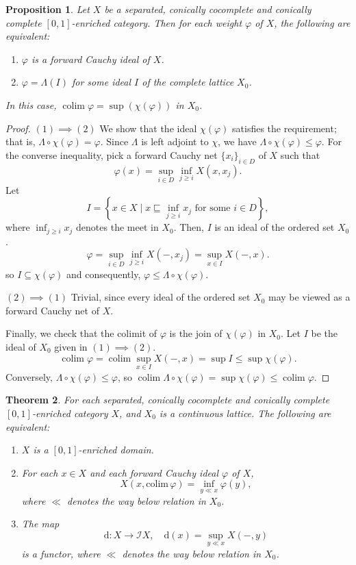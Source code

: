 \documentclass[preprint,3p,times]{elsarticle}
\theoremstyle{plain}
\newtheorem{thm}{Theorem}[section]
\newtheorem{prop}[thm]{Proposition}
\theoremstyle{definition}
\renewcommand{\phi}{\varphi}
\numberwithin{equation}{section}
\begin{document}
\begin{prop}\label{fuzzy ideal in crisp order}
   Let \(X\) be a separated, conically  cocomplete and  conically complete \([0,1]\)-enriched category. Then for each weight \(\phi\) of \(X\), the following are equivalent:
\begin{enumerate} [label={\rm(\arabic*)}]
    \item \(\phi\) is a forward Cauchy ideal of \(X\).
    \item \(\phi = \Lambda(I)\) for some ideal \(I\) of the complete lattice \(X_0\).
\end{enumerate}
In this case,   \(\operatorname{colim} \phi = \sup (\chi(\phi))\) in \(X_0\).
\end{prop}
\begin{proof}
    $(1) \implies (2)$ We show that the ideal $\chi(\phi)$ satisfies the requirement; that is, $\Lambda \circ \chi(\phi) = \phi$. Since $\Lambda$ is left adjoint to $\chi$, we have $\Lambda \circ \chi(\phi) \leq \phi$. For the converse inequality, pick a forward Cauchy net $\{x_i\}_{i \in D}$ of $X$ such that
\[
\phi(x) = \sup_{i \in D} \inf_{j \geq i} X(x, x_j).
\]
Let
\[
I = \left\{ x \in X \mid x \sqsubseteq \inf_{j \geq i} x_j \text{ for some } i \in D \right\},
\]
where $\inf_{j \geq i} x_j$ denotes the meet in $X_0$. Then, $I$ is an ideal of the ordered set $X_0$.
\[
\phi = \sup_{i \in D} \inf_{j \geq i} X(-, x_j)= \sup_{x \in I} X(-, x).
\]
so $I \subseteq \chi(\phi)$ and consequently, $\phi \leq \Lambda \circ \chi(\phi)$.

$(2) \implies (1)$ Trivial, since every ideal of the ordered set $X_0$ may be viewed as a forward Cauchy net of $X$.

Finally, we check that the colimit of \(\phi\) is the join  of \(\chi(\phi)\) in \(X_0\). Let \(I\) be the ideal of \(X_0\) given in $(1)\implies (2)$. 
\[
\operatorname{colim }\phi = \operatorname{colim }\sup_{x \in I} X(-, x)=  \sup I \le   \sup \chi(\phi).
\]
Conversely, \(\Lambda \circ \chi(\phi) \leq \phi\), so \(\operatorname{colim }\Lambda\circ \chi(\phi) =\sup \chi(\phi)\le \operatorname{colim }\phi \).
\end{proof}
\begin{thm}\label{denote way below in continuous domain}
    For each separated,  conically  cocomplete and  conically complete  \([0,1]\)-enriched category $X$, and \(X_0\) is a continuous lattice. The following are equivalent:
\begin{enumerate} [label={\rm(\arabic*)}]
    \item $X$ is a \([0,1]\)-enriched domain.
    \item For each $x \in X$ and each forward Cauchy ideal $\phi$ of $X$,
    \[
    X(x, \mathrm{colim}\,\phi) = \inf_{y \ll x} \phi(y),
    \]
    where $\ll$ denotes the way below relation in $X_0$.
    \item The map
    \[
    \mathrm{d}: X \to \mathcal{I}X,\quad \mathrm{d}(x) = \sup_{y \ll x} X(-, y)
    \]
    is a functor, where $\ll$ denotes the way below relation in $X_0$.
\end{enumerate}
\end{thm}
\end{document}
